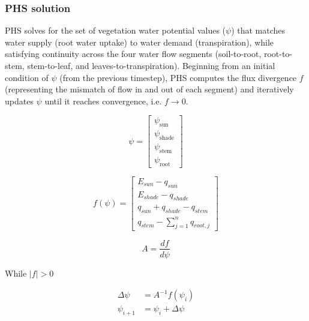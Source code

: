 \documentclass[draft,linenumbers]{agujournal}
\begin{document}
    \subsubsection{PHS solution}
    \label{sect:solution}
    
    PHS solves for the set of vegetation water potential values ($\psi$) that matches water supply (root water uptake) to water demand (transpiration), while satisfying continuity across the four water flow segments (soil-to-root, root-to-stem, stem-to-leaf, and leaves-to-transpiration). 
    Beginning from an initial condition of $\psi$ (from the previous timestep), PHS computes the flux divergence $f$ (representing the mismatch of flow in and out of each segment) and iteratively updates $\psi$ until it reaches convergence, i.e. $f\to0$.
    
    \begin{linenomath*}
    \begin{equation} 
    \psi = \left[
    \begin{array}{c}
    \psi_{\text{sun}} \\ 
    \psi_{\text{shade}} \\ 
    \psi_{\text{stem}} \\ 
    \psi_{\text{root}}            
    \end{array} \right]
    \end{equation}
    \end{linenomath*}
    
    \begin{linenomath*}
    \begin{equation}
    f\left(\psi\right) = \left[ 
    \begin{array}{c}
    E_{sun}-q_{sun}\\
    E_{shade}-q_{shade}\\
    q_{sun}+q_{shade}-q_{stem}\\
    q_{stem}-\sum_{j=1}^n{q_{root,j}}
    \end{array} \right]
    \end{equation}
    \end{linenomath*}
    
    \begin{linenomath*}
    \begin{equation}
    A = \dfrac{df}{d\psi}
    \end{equation}
    \end{linenomath*}    
    
    While $\left|f\right|>0$
    \begin{linenomath*}
    \begin{equation} \begin{aligned}
    \label{eq:iter}
    \Delta\psi &=A^{-1}f\left(\psi_i\right) \\
    \psi_{i+1}  &= \psi_i + \Delta\psi
    \end{aligned} \end{equation}
    \end{linenomath*}    
    
\end{document}
